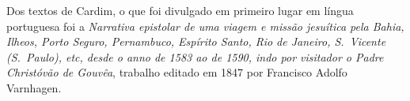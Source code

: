 Dos textos de Cardim, o que foi divulgado em primeiro lugar em língua
portuguesa foi a \textit{Narrativa epistolar de uma viagem e missão
jesuítica pela Bahia, Ilheos, Porto Seguro, Pernambuco, Espírito Santo,
Rio de Janeiro, S.~Vicente (S.~Paulo), etc, desde o anno de 1583 ao de
1590, indo por visitador o Padre Christóvão de Gouvêa}, trabalho
editado em 1847 por Francisco Adolfo Varnhagen.

